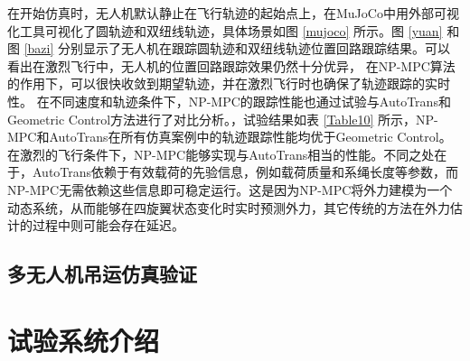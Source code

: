\documentclass[lang=chs, degree=master, blindreview=false, winfonts=true]{yanputhesis}
\begin{document}
在开始仿真时，无人机默认静止在飞行轨迹的起始点上，在MuJoCo中用外部可视化工具可视化了圆轨迹和双纽线轨迹，具体场景如图 \ref{mujoco} 所示。图 \ref{yuan} 和图 \ref{bazi} 分别显示了无人机在跟踪圆轨迹和双纽线轨迹位置回路跟踪结果。可以看出在激烈飞行中，无人机的位置回路跟踪效果仍然十分优异， 在NP-MPC算法的作用下，可以很快收敛到期望轨迹，并在激烈飞行时也确保了轨迹跟踪的实时性。
在不同速度和轨迹条件下，NP-MPC的跟踪性能也通过试验与AutoTrans和Geometric Control方法进行了对比分析。，试验结果如表 \ref{Table10} 所示，NP-MPC和AutoTrans在所有仿真案例中的轨迹跟踪性能均优于Geometric Control。在激烈的飞行条件下，NP-MPC能够实现与AutoTrans相当的性能。不同之处在于，AutoTrans依赖于有效载荷的先验信息，例如载荷质量和系绳长度等参数，而NP-MPC无需依赖这些信息即可稳定运行。这是因为NP-MPC将外力建模为一个动态系统，从而能够在四旋翼状态变化时实时预测外力，其它传统的方法在外力估计的过程中则可能会存在延迟。

\subsection{多无人机吊运仿真验证}





\section{试验系统介绍}
\end{document}
